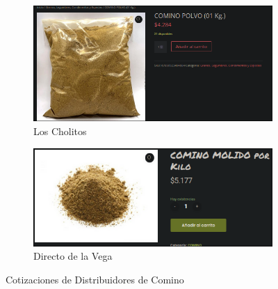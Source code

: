 \documentclass[12pt]{article}
\begin{document}
        \begin{figure}[H] %
            \centering
            \begin{subfigure}{0.4\textwidth}
                \centering
                \includegraphics[width=0.9\linewidth]{cholitos} %
                \caption{Los Cholitos}
                \label{fig:los_cholitos_comino}
            \end{subfigure}
            \hfill
            \begin{subfigure}{0.45\textwidth}
                \centering
                \includegraphics[width=0.9\linewidth]{comino} %
                \caption{Directo de la Vega}
                \label{fig:directo_de_la_vega_comino}
            \end{subfigure}
            \caption{Cotizaciones de Distribuidores de Comino}
            \label{fig:cotizaciones_comino}
        \end{figure} %
\end{document}
